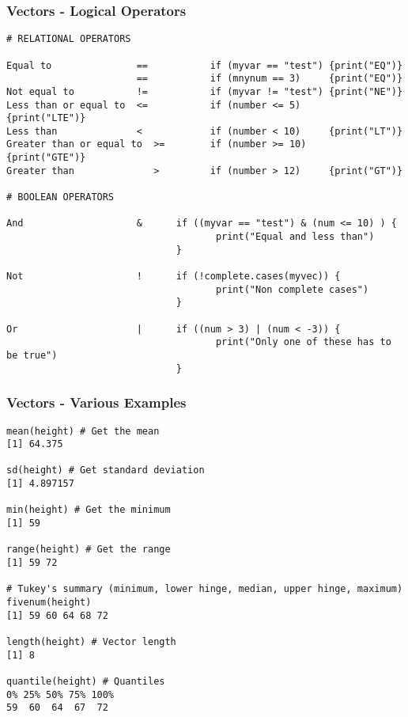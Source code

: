 \documentclass{beamer}
\begin{document}

\begin{frame}[fragile]
\frametitle{Vectors - Logical Operators}
\scriptsize
\begin{verbatim}
# RELATIONAL OPERATORS

Equal to               ==           if (myvar == "test") {print("EQ")} 
                       ==           if (mnynum == 3)     {print("EQ")} 
Not equal to           !=           if (myvar != "test") {print("NE")} 
Less than or equal to  <=           if (number <= 5)     {print("LTE")}
Less than              <            if (number < 10)     {print("LT")}
Greater than or equal to  >=        if (number >= 10)    {print("GTE")}
Greater than              >         if (number > 12)     {print("GT")}

# BOOLEAN OPERATORS 

And                    &      if ((myvar == "test") & (num <= 10) ) { 
                                     print("Equal and less than")
                              }
                                     
Not                    !      if (!complete.cases(myvec)) {
                                     print("Non complete cases")
                              } 

Or                     |      if ((num > 3) | (num < -3)) {
                                     print("Only one of these has to be true")
                              }
\end{verbatim}
\end{frame}


\begin{frame}[fragile]
\frametitle{Vectors - Various Examples}
\scriptsize
\begin{verbatim}
mean(height) # Get the mean
[1] 64.375

sd(height) # Get standard deviation
[1] 4.897157

min(height) # Get the minimum
[1] 59

range(height) # Get the range
[1] 59 72

# Tukey's summary (minimum, lower hinge, median, upper hinge, maximum)
fivenum(height) 
[1] 59 60 64 68 72

length(height) # Vector length
[1] 8

quantile(height) # Quantiles
0% 25% 50% 75% 100%
59  60  64  67  72
\end{verbatim}
\end{frame}
\end{document}
